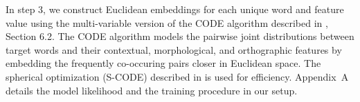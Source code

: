 In step 3, we construct Euclidean embeddings for each unique word and feature
value using the multi-variable version of the CODE algorithm described in
\cite{globerson2007euclidean}, Section 6.2.  The CODE algorithm models the
pairwise joint distributions between target words and their contextual,
morphological, and orthographic features by embedding the frequently
co-occuring pairs closer in Euclidean space.  The spherical optimization
(S-CODE) described in \cite{maron2010sphere} is used for efficiency.
Appendix~A details the model likelihood and the training procedure in our
setup. 



